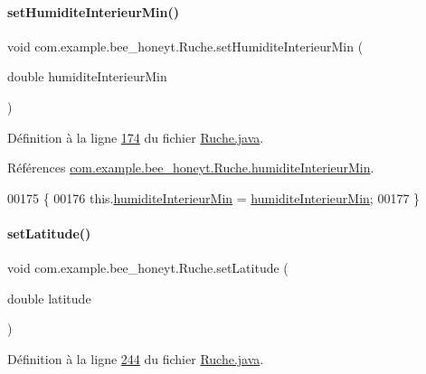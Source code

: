 \paragraph{\texorpdfstring{set\+Humidite\+Interieur\+Min()}{setHumiditeInterieurMin()}}
{\footnotesize\ttfamily void com.\+example.\+bee\+\_\+honeyt.\+Ruche.\+set\+Humidite\+Interieur\+Min (\begin{DoxyParamCaption}\item[{double}]{humidite\+Interieur\+Min }\end{DoxyParamCaption})}



Définition à la ligne \hyperlink{_ruche_8java_source_l00174}{174} du fichier \hyperlink{_ruche_8java_source}{Ruche.\+java}.



Références \hyperlink{_ruche_8java_source_l00029}{com.\+example.\+bee\+\_\+honeyt.\+Ruche.\+humidite\+Interieur\+Min}.


\begin{DoxyCode}
00175     \{
00176         this.\hyperlink{classcom_1_1example_1_1bee__honeyt_1_1_ruche_ab8234d1bae28a10622b331d3b773445d}{humiditeInterieurMin} = \hyperlink{classcom_1_1example_1_1bee__honeyt_1_1_ruche_ab8234d1bae28a10622b331d3b773445d}{humiditeInterieurMin};
00177     \}
\end{DoxyCode}
\mbox{\label{classcom_1_1example_1_1bee__honeyt_1_1_ruche_a38df72556466a10a52a4f3b799722532}} 
\paragraph{\texorpdfstring{set\+Latitude()}{setLatitude()}}
{\footnotesize\ttfamily void com.\+example.\+bee\+\_\+honeyt.\+Ruche.\+set\+Latitude (\begin{DoxyParamCaption}\item[{double}]{latitude }\end{DoxyParamCaption})}



Définition à la ligne \hyperlink{_ruche_8java_source_l00244}{244} du fichier \hyperlink{_ruche_8java_source}{Ruche.\+java}.



